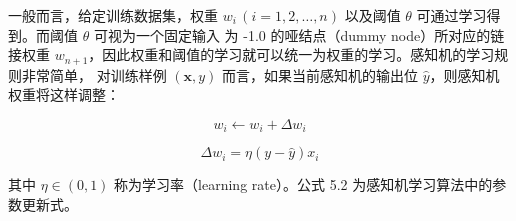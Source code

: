 \documentclass[../studies-ml.tex]{subfiles}
\begin{document}
一般而言，给定训练数据集，权重 $w_i\, (i=1,2,\dots,n)$ 以及阈值 $\theta$ 可通过学习得到。而阈值 $\theta$ 可视为一个固定输入
为 -1.0 的哑结点（dummy node）所对应的链接权重 $w_{n+1}$，因此权重和阈值的学习就可以统一为权重的学习。感知机的学习规则非常简单，
对训练样例 $(\pmb{x},y)$ 而言，如果当前感知机的输出位 $\hat{y}$，则感知机权重将这样调整：

\begin{equation}
  w_i \leftarrow w_i + \Delta w_i
\end{equation}

\begin{equation}
  \Delta w_i = \eta (y - \hat{y}) x_i
\end{equation}

其中 $\eta \in (0,1)$ 称为学习率（learning rate）。公式 5.2 为感知机学习算法中的参数更新式。
\end{document}

